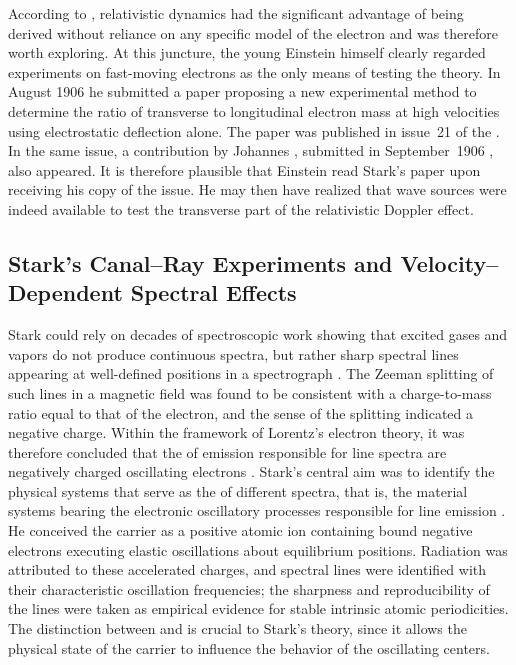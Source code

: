 \documentclass[pdflatex,sn-basic]{sn-jnl}
\begin{document}
According to \citet{Planck1906},  relativistic dynamics had the significant advantage of being derived without reliance on any specific model of the electron and was therefore worth exploring. At this juncture, the young Einstein himself clearly regarded experiments on fast-moving electrons as the only means of testing the theory. In August 1906 he submitted a paper \citep{Einstein1906c} proposing a new experimental method to determine the ratio of transverse to longitudinal electron mass at high velocities using electrostatic deflection alone. The paper was published in issue~21 of the . In the same issue, a contribution by Johannes \citet{Stark1906}, submitted in September~1906 , also appeared. It is therefore plausible that Einstein read Stark’s paper upon receiving his copy of the  issue. He may then have realized that wave sources were indeed available to test the transverse part of the relativistic Doppler effect.



\subsection{Stark’s Canal--Ray Experiments and Velocity--Dependent Spectral Effects\label{sub:stark}}
%
Stark could rely on decades of spectroscopic work showing that excited gases and vapors do not produce continuous spectra, but rather sharp spectral lines appearing at well-defined positions in a spectrograph \citep{Hentschel2002}. The Zeeman splitting of such lines in a magnetic field was found to be consistent with a charge-to-mass ratio equal to that of the electron, and the sense of the splitting indicated a negative charge. Within the framework of Lorentz’s electron theory, it was therefore concluded that the   of emission responsible for line spectra are negatively charged oscillating electrons \citep[401]{Stark1906}. Stark’s central aim was to identify the physical systems that serve as the   of different spectra, that is, the material systems bearing the electronic oscillatory processes responsible for line emission \citep[402]{Stark1906}. He conceived the carrier as a positive atomic ion containing bound negative electrons executing elastic oscillations about equilibrium positions. Radiation was attributed to these accelerated charges, and spectral lines were identified with their characteristic oscillation frequencies; the sharpness and reproducibility of the lines were taken as empirical evidence for stable intrinsic atomic periodicities. The distinction between  and  is crucial to Stark’s theory, since it allows the physical state of the carrier to influence the behavior of the oscillating centers.
\end{document}
